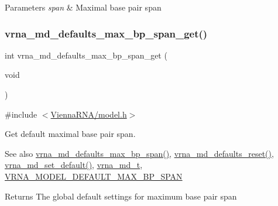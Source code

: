 \begin{DoxyParams}{Parameters}
{\em span} & Maximal base pair span \\
\hline
\end{DoxyParams}
\mbox{\label{group__model__details_gaa60f989e062fecd4d4bac89c1883da85}} 
\subsubsection{\texorpdfstring{vrna\+\_\+md\+\_\+defaults\+\_\+max\+\_\+bp\+\_\+span\+\_\+get()}{vrna\_md\_defaults\_max\_bp\_span\_get()}}
{\footnotesize\ttfamily int vrna\+\_\+md\+\_\+defaults\+\_\+max\+\_\+bp\+\_\+span\+\_\+get (\begin{DoxyParamCaption}\item[{void}]{ }\end{DoxyParamCaption})}



{\ttfamily \#include $<$\hyperlink{model_8h}{Vienna\+R\+N\+A/model.\+h}$>$}



Get default maximal base pair span. 

\begin{DoxySeeAlso}{See also}
\hyperlink{group__model__details_ga4c4bc962f09b4480cb8499f1cf8ae4ec}{vrna\+\_\+md\+\_\+defaults\+\_\+max\+\_\+bp\+\_\+span()}, \hyperlink{group__model__details_ga70834424cf804d149937de89f80ceb45}{vrna\+\_\+md\+\_\+defaults\+\_\+reset()}, \hyperlink{group__model__details_ga8ac6ff84936282436f822644bf841f66}{vrna\+\_\+md\+\_\+set\+\_\+default()}, \hyperlink{group__model__details_ga1f8a10e12a0a1915f2a4eff0b28ea17c}{vrna\+\_\+md\+\_\+t}, \hyperlink{group__model__details_ga7cb6f4ae8fdebff6746a4410814f2977}{V\+R\+N\+A\+\_\+\+M\+O\+D\+E\+L\+\_\+\+D\+E\+F\+A\+U\+L\+T\+\_\+\+M\+A\+X\+\_\+\+B\+P\+\_\+\+S\+P\+AN} 
\end{DoxySeeAlso}
\begin{DoxyReturn}{Returns}
The global default settings for maximum base pair span 
\end{DoxyReturn}
\mbox{\label{group__model__details_gac152f1e78c1058a10261022c8dfda0f7}} 
